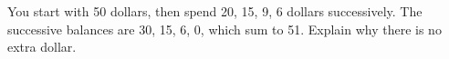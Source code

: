 You start with 50 dollars, then spend 20, 15, 9, 6 dollars successively. The successive balances are 30, 15, 6, 0, which sum to 51. Explain why there is no extra dollar.
